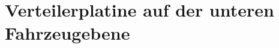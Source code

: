 

\pagestyle{fancy}
\rhead{\thepage} \chead{} 
\cfoot{}

\section{Verteilerplatine auf der unteren Fahrzeugebene}\label{Sec8}


\newpage